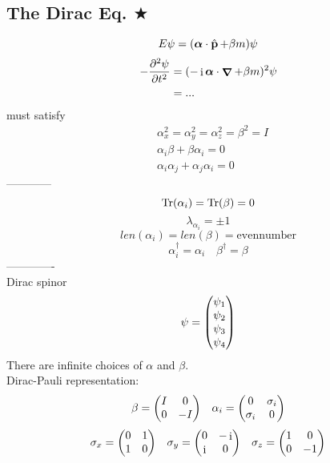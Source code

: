 \documentclass[a4paper]{article}
\DeclareMathOperator{\I}{\mathrm{i}}
\DeclareMathOperator{\na}{\bm{\nabla}}
\DeclareMathOperator{\hp}{\hat{\vb{p}}}
\numberwithin{equation}{section}
\begin{document}
\subsection{The Dirac Eq. $ \bigstar $}
\begin{equation}\label{key}
E\psi = (\bm\alpha\cdot\hp + \beta m)\psi
\end{equation}
\begin{equation}\label{key}
\begin{aligned}
-\pdv[2]{\psi}{t} &= (-\I\bm\alpha\cdot\na + \beta m)^2\psi\\
&= ...
\end{aligned}
\end{equation}
must satisfy
\begin{equation}\label{key}
\begin{aligned}
&\alpha_x^2 = \alpha_y^2 = \alpha_z^2 = \beta^2 = I\\
&\alpha_i\beta + \beta\alpha_i = 0\\
&\alpha_i\alpha_j + \alpha_j\alpha_i = 0
\end{aligned}
\end{equation}
------------
\begin{equation}\label{key}
\Tr(\alpha_i) = \Tr(\beta) = 0
\end{equation}
\begin{equation}\label{key}
\lambda_{\alpha_i} = \pm 1
\end{equation}
\begin{equation}\label{key}
len(\alpha_i) = len(\beta) = \mathrm{even number}
\end{equation}
\begin{equation}\label{key}
\alpha_i^\dagger = \alpha_i \quad \beta^\dagger = \beta
\end{equation}
-------------\\
Dirac spinor
\begin{equation}\label{key}
\psi = \mqty(\psi_1\\ \psi_2\\ \psi_3\\ \psi_4)
\end{equation}
There are infinite choices of $ \alpha $ and $ \beta $.\\
Dirac-Pauli representation:
\begin{equation}\label{key}
\beta = \mqty(I &0\\ 0 &-I) \quad \alpha_i = \mqty(0 &\sigma_i\\ \sigma_i &0)
\end{equation}
\begin{equation}\label{key}
\sigma_x = \mqty(0 & 1\\1 & 0) \quad \sigma_y = \mqty(0 & -\I\\ \I & 0) \quad \sigma_z = \mqty(1 & 0\\ 0 & -1)
\end{equation}
\end{document}
